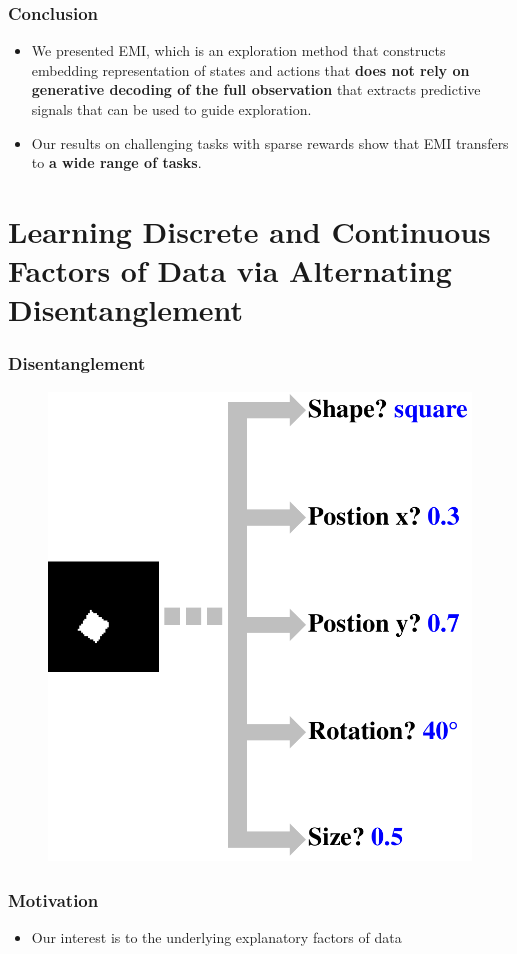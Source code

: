 \documentclass[10pt,mathserif]{beamer}
\begin{document}
\begin{frame}
\frametitle{Conclusion}
  \begin{itemize} \itemsep=16pt
      \item We presented EMI, which is an exploration method that constructs embedding representation of states and actions that \textbf{does not rely on generative decoding of the full observation} that extracts predictive signals that can be used to guide exploration.\pause
      \item Our results on challenging tasks with sparse rewards show that EMI transfers to \textbf{a wide range of tasks}.
  \end{itemize}
\end{frame}


\section{Learning Discrete and Continuous Factors of Data via Alternating Disentanglement}

\begin{frame}
\frametitle{Disentanglement}
\begin{figure}
\centering
\includegraphics[width=0.6\linewidth]{dis_asset/disentanglement}
\end{figure}
\end{frame}

\begin{frame}
\frametitle{Motivation}
\begin{itemize}\itemsep=20pt
\item Our interest is to {\color{blue}{disentangle}} the underlying explanatory factors of data {\color{blue}{without any supervision.}}
\end{itemize}
\end{frame}
\end{document}
